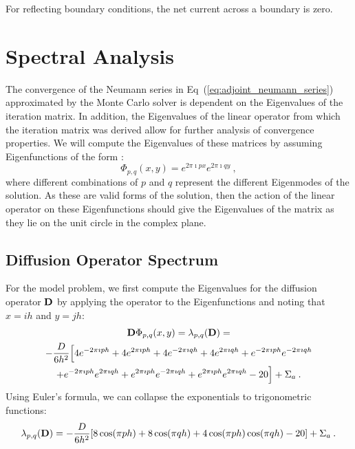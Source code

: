 \documentclass[letterpaper,12pt]{article}
\begin{document}
For reflecting boundary conditions, the net current across a boundary
is zero.

\section{Spectral Analysis}
The convergence of the Neumann series in
Eq~(\ref{eq:adjoint_neumann_series}) approximated by the Monte Carlo
solver is dependent on the Eigenvalues of the iteration matrix. In
addition, the Eigenvalues of the linear operator from which the
iteration matrix was derived allow for further analysis of convergence
properties. We will compute the Eigenvalues of these matrices by
assuming Eigenfunctions of the form \cite{leveque_finite_2007}:
\begin{equation}
  \Phi_{p,q}(x,y) = e^{2 \pi \imath p x} e^{2 \pi \imath q y}\:,
  \label{eq:eigenfunction_form}
\end{equation}
where different combinations of $p$ and $q$ represent the different
Eigenmodes of the solution. As these are valid forms of the solution,
then the action of the linear operator on these Eigenfunctions should
give the Eigenvalues of the matrix as they lie on the unit circle in
the complex plane.

\subsection{Diffusion Operator Spectrum}
For the model problem, we first compute the Eigenvalues for the
diffusion operator $\mathbf{D}$ by applying the operator to the
Eigenfunctions and noting that $x=ih$ and $y=jh$:
\begin{multline}
  \mathbf{D}\Phi_{p,q}(x,y) = \lambda_{p,q}(\mathbf{D})
  =\\ -\frac{D}{6h^2}\Big[4 e^{-2 \pi \imath p h} + 4 e^{2 \pi \imath
      p h} + 4 e^{-2 \pi \imath q h} + 4 e^{2 \pi \imath q h} + e^{-2
      \pi \imath p h} e^{-2 \pi \imath q h} \\ + e^{-2 \pi \imath p h}
    e^{2 \pi \imath q h} + e^{2 \pi \imath p h} e^{-2 \pi \imath q h}
    + e^{2 \pi \imath p h} e^{2 \pi \imath q h} - 20\Big] + \Sigma_a
  \:.
  \label{eq:deriv_diff_1}
\end{multline}
Using Euler's formula, we can collapse the exponentials to
trigonometric functions:
\begin{equation}
  \lambda_{p,q}(\mathbf{D}) = -\frac{D}{6h^2}[ 8 \cos(\pi p h) + 8
    \cos(\pi q h) + 4 \cos(\pi p h) \cos(\pi q h) - 20] + \Sigma_a\:.
  \label{eq:deriv_diff_2}
\end{equation}
\end{document}
